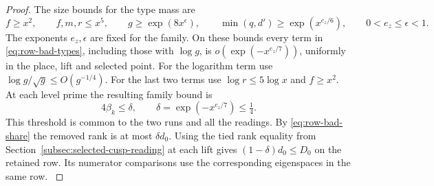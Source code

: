 \begin{proof}

The size bounds for the type mass are
\begin{equation}\label{eq:paired-bad-type-sizes}
 f\ge x^2,\qquad f,m,r\le x^5,\qquad
 g\ge \exp(8x^\epsilon),\qquad
 \min(q,d')\ge\exp(x^{e_z/6}),\qquad
 0<e_z\le\epsilon<1 .
\end{equation}
The exponents \(e_z,\epsilon\) are fixed for the family. On these bounds every term in \eqref{eq:row-bad-types},
including those with $\log g$, is $o(\exp(-x^{e_z/7}))$, uniformly
in the place, lift and selected point. For the logarithm term use
$\log g/\sqrt g\le O(g^{-1/4})$. For the last two terms use
$\log r\le5\log x$ and $f\ge x^2$. At each level prime the resulting family bound is
\[
  4\beta_k\le\delta,\qquad \delta=\exp(-x^{e_z/7})\le\tfrac14.
\]
This threshold is common to the two runs and all the readings.
By \eqref{eq:row-bad-share} the removed rank is at most
$\delta d_0$. Using the tied rank equality from
Section~\ref{subsec:selected-cusp-reading} at each lift gives
$(1-\delta)d_0\le D_0$ on the retained row. Its numerator
comparisons use the corresponding eigenspaces in the same row.
\label{cor:paired-good-share-5}
\end{proof}
